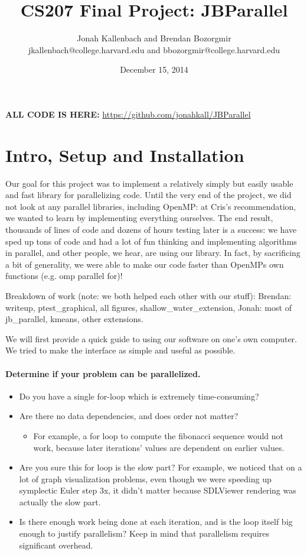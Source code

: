 \documentclass{article}
\title{CS207 Final Project: JBParallel}
\author{Jonah Kallenbach and Brendan Bozorgmir
\\jkallenbach@college.harvard.edu and bbozorgmir@college.harvard.edu}
\date{December 15, 2014}
\begin{document}
\maketitle

\textbf{ALL CODE IS HERE:} \url{https://github.com/jonahkall/JBParallel}

\section{Intro, Setup and Installation}

Our goal for this project was to implement a relatively simply but easily usable and fast library for parallelizing code.  Until the very end of the project, we did not look at any parallel libraries, including OpenMP: at Cris's recommendation, we wanted to learn by implementing everything ourselves.  The end result, thousands of lines of code and dozens of hours testing later is a success: we have sped up tons of code and had a lot of fun thinking and implementing algorithms in parallel, and other people, we hear, are using our library.  In fact, by sacrificing a bit of generality, we were able to make our code faster than OpenMPs own functions (e.g. omp parallel for)!

Breakdown of work (note: we both helped each other with our stuff): Brendan: writeup, ptest\_graphical, all figures, shallow\_water\_extension, Jonah: most of jb\_parallel, kmeans, other extensions.

We will first provide a quick guide to using our software on one's own computer.  We tried to make the interface as simple and useful as possible.
 
\paragraph*{Determine if your problem can be parallelized.}
\begin{itemize}
\item{Do you have a single for-loop which is extremely time-consuming?}
\item Are there no data dependencies, and does order not matter?
\begin{itemize}
	\item For example, a for loop to compute the fibonacci sequence would not work, because later iterations' values are dependent on earlier values.
\end{itemize}

\item Are you sure this for loop is the slow part? For example, we noticed that on a lot of graph visualization problems, even though we were speeding up symplectic Euler step 3x, it didn't matter because SDLViewer rendering was actually the slow part.
\item Is there enough work being done at each iteration, and is the loop itself big enough to justify parallelism? Keep in mind that parallelism requires significant overhead.
\end{itemize}
\end{document}
